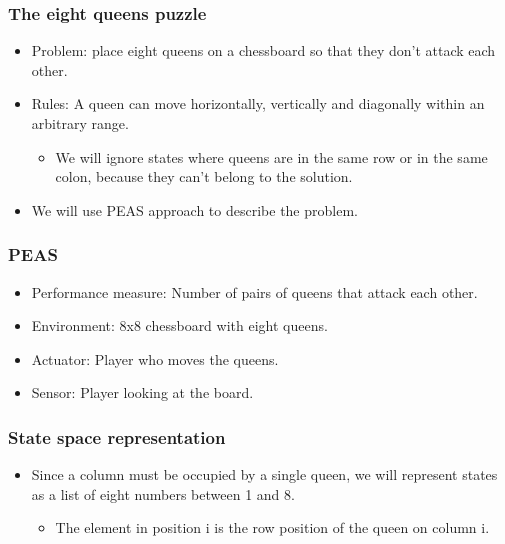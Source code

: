 \documentclass{beamer}
\begin{document}
    \begin{frame}
    \frametitle{The eight queens puzzle}
    \begin{itemize}
        \item Problem: place eight queens on a chessboard so that they don't attack each other.
        \pause
        \item Rules: A queen can move horizontally, vertically and diagonally within an arbitrary range.
        \pause
            \begin{itemize}
                \item We will ignore states where queens are in the same row or in the same colon, because they can't belong to the solution.
            \end{itemize}
        \pause
        \item We will use PEAS approach to describe the problem.
    \end{itemize}
    \end{frame}

    \begin{frame}
    \frametitle{PEAS}
    \pause
        \begin{itemize}
            \item Performance measure: Number of pairs of queens that attack each other.
            \pause
            \item Environment: 8x8 chessboard with eight queens. 
            \pause
            \item Actuator: Player who moves the queens.
            \pause
            \item Sensor: Player looking at the board.
        \end{itemize}
    \end{frame}

    \begin{frame}
    \frametitle{State space representation}
    \pause
        \begin{itemize}
            \item Since a column must be occupied by a single queen, we will represent states as a list of eight numbers between 1 and 8.
            \pause
            \begin{itemize}
                \item The element in position i is the row position of the queen on column i.
            \end{itemize}
        \end{itemize}
    \end{frame}
\end{document}
